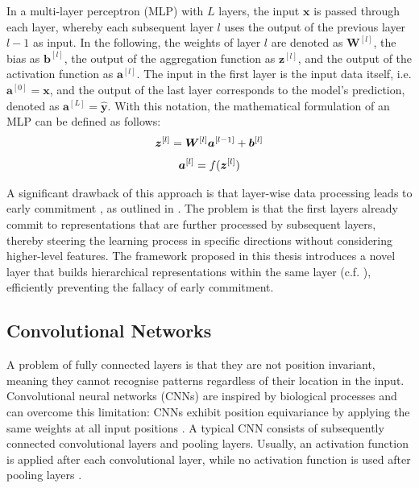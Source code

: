 In a multi-layer perceptron (MLP) with $L$ layers, the input \(\boldsymbol{x}\) is passed through each layer, whereby each subsequent layer \(l\) uses the output of the previous layer \(l-1\) as input.
In the following, the weights of layer $l$ are denoted as $\boldsymbol{W}^{[l]}$, the bias as \(\boldsymbol{b}^{[l]}\), the output of the aggregation function as \(\boldsymbol{z}^{[l]}\), and the output of the activation function as \(\boldsymbol{a}^{[l]}\).
The input in the first layer is the input data itself, i.e. $\boldsymbol{a}^{[0]} = \boldsymbol{x}$, and the output of the last layer corresponds to the model's prediction, denoted as $\boldsymbol{a}^{[L]} = \hat{\boldsymbol{y}}$. With this notation, the mathematical formulation of an MLP can be defined as follows:
%
\begin{align}\eqlbl{mlp}
		\boldsymbol{z}^{[l]} = \boldsymbol{W}^{[l]}\boldsymbol{a}^{[l-1]} + \boldsymbol{b}^{[l]}
\end{align}
%
\begin{align}\eqlbl{mlp2}
		\boldsymbol{a}^{[l]} = f(\boldsymbol{z}^{[l]})
\end{align}

A significant drawback of this approach is that layer-wise data processing leads to early commitment , as outlined in .
The problem is that the first layers already commit to representations that are further processed by subsequent layers, thereby steering the learning process in specific directions without considering higher-level features.
The framework proposed in this thesis introduces a novel layer that builds hierarchical representations within the same layer (c.f. ), efficiently preventing the fallacy of early commitment.


\subsection{Convolutional Networks}
A problem of fully connected layers is that they are not position invariant, meaning they cannot recognise patterns regardless of their location in the input.
Convolutional neural networks (CNNs)  are inspired by biological processes  and can overcome this limitation: CNNs exhibit position equivariance by applying the same weights at all input positions .
A typical CNN consists of subsequently connected convolutional layers and pooling layers.
Usually, an activation function is applied after each convolutional layer, while no activation function is used after pooling layers .

